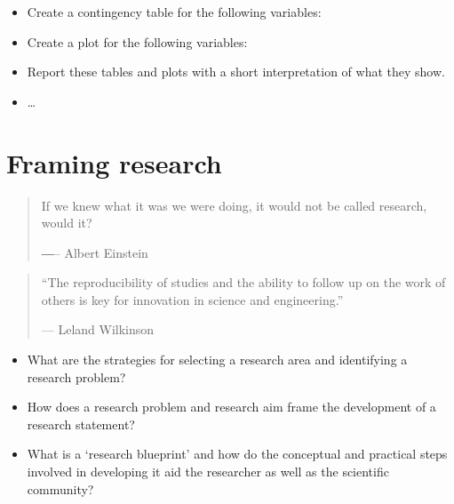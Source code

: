 \documentclass[
  letterpaper,
]{latex/krantz}
\providecommand{\tightlist}{%
  \setlength{\itemsep}{0pt}\setlength{\parskip}{0pt}}\usepackage{longtable,booktabs,array}
\begin{document}
\begin{tcolorbox}[enhanced jigsaw, colbacktitle=quarto-callout-note-color!10!white, arc=.35mm, toprule=.15mm, breakable, colframe=quarto-callout-note-color-frame, bottomrule=.15mm, opacitybacktitle=0.6, coltitle=black, titlerule=0mm, colback=white, toptitle=1mm, bottomtitle=1mm, title=\textcolor{quarto-callout-note-color}{\faInfo}\hspace{0.5em}{Technical exercises}, rightrule=.15mm, leftrule=.75mm, opacityback=0, left=2mm]

\begin{itemize}
\tightlist
\item
  Create a contingency table for the following variables:
\item
  Create a plot for the following variables:
\item
  Report these tables and plots with a short interpretation of what they
  show.
\item
  \ldots{}
\end{itemize}

\end{tcolorbox}

\hypertarget{sec-framing-research}{%
\chapter{Framing research}\label{sec-framing-research}}

\begin{quote}
If we knew what it was we were doing, it would not be called research,
would it?

―-- Albert Einstein
\end{quote}

\begin{quote}
``The reproducibility of studies and the ability to follow up on the
work of others is key for innovation in science and engineering.''

--- Leland Wilkinson
\end{quote}

\begin{tcolorbox}[enhanced jigsaw, colbacktitle=quarto-callout-note-color!10!white, arc=.35mm, toprule=.15mm, breakable, colframe=quarto-callout-note-color-frame, bottomrule=.15mm, opacitybacktitle=0.6, coltitle=black, titlerule=0mm, colback=white, toptitle=1mm, bottomtitle=1mm, title=\textcolor{quarto-callout-note-color}{\faInfo}\hspace{0.5em}{Keys}, rightrule=.15mm, leftrule=.75mm, opacityback=0, left=2mm]

\begin{itemize}
\tightlist
\item
  What are the strategies for selecting a research area and identifying
  a research problem?
\item
  How does a research problem and research aim frame the development of
  a research statement?
\item
  What is a `research blueprint' and how do the conceptual and practical
  steps involved in developing it aid the researcher as well as the
  scientific community?
\end{itemize}

\end{tcolorbox}
\end{document}
